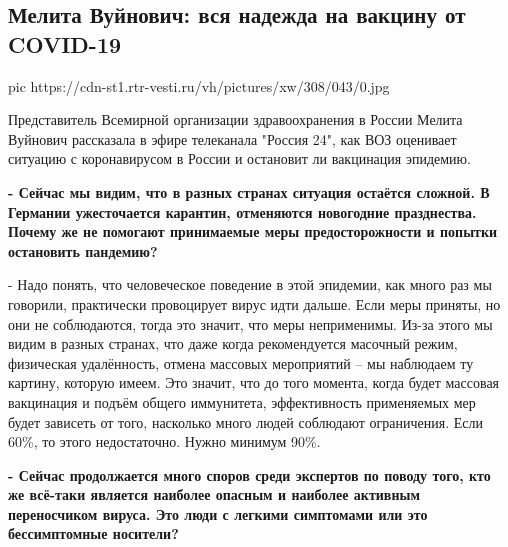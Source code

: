  
 
 
 
 
 
\subsection{Мелита Вуйнович: вся надежда на вакцину от COVID-19}
\label{sec:17_12_2020.news.ru.vesti.4.melita_vujnovich_vaccine}

\ifcmt
pic https://cdn-st1.rtr-vesti.ru/vh/pictures/xw/308/043/0.jpg
\fi


Представитель Всемирной организации здравоохранения в России Мелита Вуйнович
рассказала в эфире телеканала "Россия 24", как ВОЗ оценивает ситуацию с
коронавирусом в России и остановит ли вакцинация эпидемию.

\textbf{- Сейчас мы видим, что в разных странах ситуация остаётся сложной. В Германии
ужесточается карантин, отменяются новогодние празднества. Почему же не помогают
принимаемые меры предосторожности и попытки остановить пандемию?}

- Надо понять, что человеческое поведение в этой эпидемии, как много раз мы
говорили, практически провоцирует вирус идти дальше. Если меры приняты, но они
не соблюдаются, тогда это значит, что меры неприменимы. Из-за этого мы видим в
разных странах, что даже когда рекомендуется масочный режим, физическая
удалённость, отмена массовых мероприятий – мы наблюдаем ту картину, которую
имеем. Это значит, что до того момента, когда будет массовая вакцинация и
подъём общего иммунитета, эффективность применяемых мер будет зависеть от того,
насколько много людей соблюдают ограничения. Если 60\%, то этого недостаточно.
Нужно минимум 90\%.

\textbf{- Сейчас продолжается много споров среди экспертов по поводу того, кто же
всё-таки является наиболее опасным и наиболее активным переносчиком вируса. Это
люди с легкими симптомами или это бессимптомные носители?}

